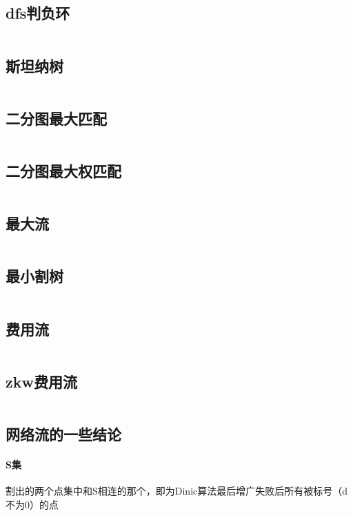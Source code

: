 \documentclass[a4paper,11pt]{article}
\begin{document}
    \subsection{dfs判负环}
    \inputminted[breaklines]{c++}{Graph/dfs判负环.cpp}

    \subsection{斯坦纳树}
    \inputminted[breaklines]{c++}{Graph/斯坦纳树.cpp}
    
    \subsection{二分图最大匹配}
    \inputminted[breaklines]{c++}{Graph/二分图最大匹配.cpp}

    \subsection{二分图最大权匹配}
    \inputminted[breaklines]{c++}{Graph/KM.cpp}

    \subsection{最大流}
    \inputminted[breaklines]{c++}{Graph/Dinic.cpp}

    \subsection{最小割树}
    \inputminted[breaklines]{c++}{Graph/最小割树.cpp}
    
    \subsection{费用流}
    \inputminted[breaklines]{c++}{Graph/费用流.cpp}
    
     \subsection{zkw费用流}
    \inputminted[breaklines]{c++}{Graph/zkw费用流.cpp}
    
    \subsection{网络流的一些结论}
    
    \paragraph{S集}割出的两个点集中和S相连的那个，即为Dinic算法最后增广失败后所有被标号（d不为0）的点
\end{document}
